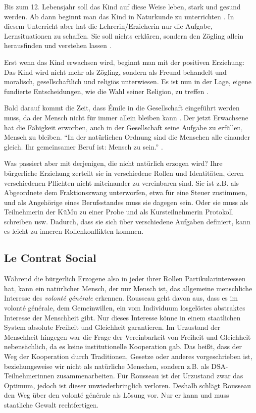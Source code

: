 Bis zum 12. Lebensjahr soll das Kind auf diese Weise leben, stark und gesund werden.
Ab dann beginnt man das Kind in Naturkunde zu unterrichten \parencite[55]{rousseau-1762}.
In diesem Unterricht aber hat die Lehrerin/Erzieherin nur die Aufgabe, Lernsituationen zu schaffen.
Sie soll nichts erklären, sondern den Zögling allein herausfinden und verstehen lassen \parencite[56]{rousseau-1762}.

Erst wenn das Kind erwachsen wird, beginnt man mit der positiven Erziehung:
Das Kind wird nicht mehr als Zögling, sondern als Freund behandelt und moralisch, gesellschaftlich und religiös unterwiesen.
Es ist nun in der Lage, eigene fundierte Entscheidungen, wie die Wahl seiner Religion, zu treffen \parencite[60f.]{rousseau-1762}.

Bald darauf kommt die Zeit, dass Émile in die Gesellschaft eingeführt werden muss, da der Mensch nicht für immer allein bleiben kann \parencite[61]{rousseau-1762}.
Der jetzt Erwachsene hat die Fähigkeit erworben, auch in der Gesellschaft seine Aufgabe zu erfüllen, Mensch zu bleiben.
``In der natürlichen Ordnung sind die Menschen alle einander gleich. Ihr gemeinsamer Beruf ist: Mensch zu sein.''
\parencite[50]{rousseau-1762}.

Was passiert aber mit derjenigen, die nicht natürlich erzogen wird?
Ihre bürgerliche Erziehung zerteilt sie in verschiedene Rollen und Identitäten, deren verschiedenen Pflichten nicht miteinander zu vereinbaren sind.
Sie ist z.B. als Abgeordnete dem Fraktionszwang unterworfen, etwa für eine Steuer zustimmen, und als Angehörige eines Berufsstandes muss sie dagegen sein.
Oder sie muss als Teilnehmerin der KüMu zu einer Probe und als Kursteilnehmerin Protokoll schreiben usw.
Dadurch, dass sie sich über verschiedene Aufgaben definiert, kann es leicht zu inneren Rollenkonflikten kommen.


\subsection{Le Contrat Social}

Während die bürgerlich Erzogene also in jeder ihrer Rollen Partikularinteressen hat, kann ein natürlicher Mensch, der nur Mensch ist, das allgemeine menschliche Interesse des \emph{volonté générale} erkennen.
Rousseau geht davon aus, dass es im volonté générale, dem Gemeinwillen, ein vom Individuum losgelöstes abstraktes Interesse der Menschheit gibt.
Nur dieses Interesse könne in einem staatlichen System absolute Freiheit und Gleichheit garantieren.
Im Urzustand der Menschheit hingegen war die Frage der Vereinbarkeit von Freiheit und Gleichheit nebensächlich, da es keine institutionelle Kooperation gab.
Das heißt, dass der Weg der Kooperation durch Traditionen, Gesetze oder anderes vorgeschrieben ist, beziehungsweise wir nicht als natürliche Menschen, sondern z.B. als DSA-Teilnehmerinnen zusammenarbeiten.
Für Rousseau ist der Urzustand zwar das Optimum, jedoch ist dieser unwiederbringlich verloren.
Deshalb schlägt Rousseau den Weg über den volonté générale als Lösung vor.
Nur er kann und muss staatliche Gewalt rechtfertigen.

